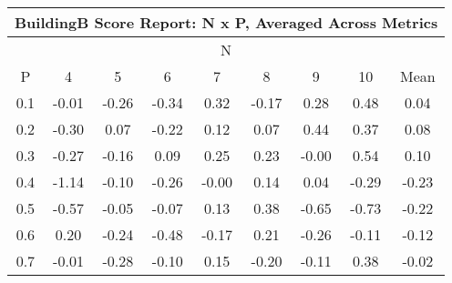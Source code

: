 \begin{longtable}{ | c || c | c | c | c | c | c | c || c |}
\hline
\multicolumn{9}{|c|}{ BuildingB Score Report: N x P, Averaged Across Metrics } \\
\hline
\multicolumn{9}{|c|}{ N } \\
\hline
P & 4 & 5 & 6 & 7 & 8 & 9 & 10 & Mean\\
\hline
\hline
\endhead
0.1 &  \cellcolor[HTML]{FFFFFF} -0.01 &  \cellcolor[HTML]{FFF7F7} -0.26 &  \cellcolor[HTML]{FFF7F7} -0.34 &  \cellcolor[HTML]{F7F7FF} 0.32 &  \cellcolor[HTML]{FFF7F7} -0.17 &  \cellcolor[HTML]{F7F7FF} 0.28 &  \cellcolor[HTML]{EFEFFF} 0.48 &  \cellcolor[HTML]{FFFFFF} 0.04 \\
0.2 &  \cellcolor[HTML]{FFF7F7} -0.30 &  \cellcolor[HTML]{FFFFFF} 0.07 &  \cellcolor[HTML]{FFF7F7} -0.22 &  \cellcolor[HTML]{FFFFFF} 0.12 &  \cellcolor[HTML]{FFFFFF} 0.07 &  \cellcolor[HTML]{F7F7FF} 0.44 &  \cellcolor[HTML]{F7F7FF} 0.37 &  \cellcolor[HTML]{FFFFFF} 0.08 \\
0.3 &  \cellcolor[HTML]{FFF7F7} -0.27 &  \cellcolor[HTML]{FFF7F7} -0.16 &  \cellcolor[HTML]{FFFFFF} 0.09 &  \cellcolor[HTML]{F7F7FF} 0.25 &  \cellcolor[HTML]{F7F7FF} 0.23 &  \cellcolor[HTML]{FFFFFF} -0.00 &  \cellcolor[HTML]{EFEFFF} 0.54 &  \cellcolor[HTML]{FFFFFF} 0.10 \\
0.4 &  \cellcolor[HTML]{FFDFDF} -1.14 &  \cellcolor[HTML]{FFFFFF} -0.10 &  \cellcolor[HTML]{FFF7F7} -0.26 &  \cellcolor[HTML]{FFFFFF} -0.00 &  \cellcolor[HTML]{FFFFFF} 0.14 &  \cellcolor[HTML]{FFFFFF} 0.04 &  \cellcolor[HTML]{FFF7F7} -0.29 &  \cellcolor[HTML]{FFF7F7} -0.23 \\
0.5 &  \cellcolor[HTML]{FFEFEF} -0.57 &  \cellcolor[HTML]{FFFFFF} -0.05 &  \cellcolor[HTML]{FFFFFF} -0.07 &  \cellcolor[HTML]{FFFFFF} 0.13 &  \cellcolor[HTML]{F7F7FF} 0.38 &  \cellcolor[HTML]{FFEFEF} -0.65 &  \cellcolor[HTML]{FFEFEF} -0.73 &  \cellcolor[HTML]{FFF7F7} -0.22 \\
0.6 &  \cellcolor[HTML]{F7F7FF} 0.20 &  \cellcolor[HTML]{FFF7F7} -0.24 &  \cellcolor[HTML]{FFEFEF} -0.48 &  \cellcolor[HTML]{FFF7F7} -0.17 &  \cellcolor[HTML]{F7F7FF} 0.21 &  \cellcolor[HTML]{FFF7F7} -0.26 &  \cellcolor[HTML]{FFFFFF} -0.11 &  \cellcolor[HTML]{FFFFFF} -0.12 \\
0.7 &  \cellcolor[HTML]{FFFFFF} -0.01 &  \cellcolor[HTML]{FFF7F7} -0.28 &  \cellcolor[HTML]{FFFFFF} -0.10 &  \cellcolor[HTML]{FFFFFF} 0.15 &  \cellcolor[HTML]{FFF7F7} -0.20 &  \cellcolor[HTML]{FFFFFF} -0.11 &  \cellcolor[HTML]{F7F7FF} 0.38 &  \cellcolor[HTML]{FFFFFF} -0.02 \\

\end{longtable}
